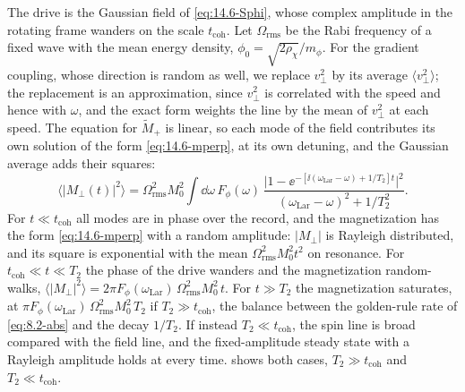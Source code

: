 The drive is the Gaussian field of \cref{eq:14.6-Sphi}, whose complex amplitude in the rotating frame wanders on the scale $t_{\mathrm{coh}}$. Let $\Omega_{\mathrm{rms}}$ be the Rabi frequency of a fixed wave with the mean energy density, $\phi_0 = \sqrt{2\rho_\chi}/m_\phi$. For the gradient coupling, whose direction is random as well, we replace $v_\perp^2$ by its average $\langle v_\perp^2\rangle$; the replacement is an approximation, since $v_\perp^2$ is correlated with the speed and hence with $\omega$, and the exact form weights the line by the mean of $v_\perp^2$ at each speed. The equation for $\tilde M_+$ is linear, so each mode of the field contributes its own solution of the form \cref{eq:14.6-mperp}, at its own detuning, and the Gaussian average adds their squares:
\begin{equation}
  \bigl\langle|M_\perp(t)|^2\bigr\rangle = \Omega_{\mathrm{rms}}^2M_0^2\int\dd\omega\,F_\phi(\omega)\,\frac{\bigl|1 - \ee^{-[\ii(\omega_{\mathrm{Lar}} - \omega) + 1/T_2]t}\bigr|^2}{(\omega_{\mathrm{Lar}} - \omega)^2 + 1/T_2^2} .
  \label{eq:14.6-ms}
\end{equation}
For $t \ll t_{\mathrm{coh}}$ all modes are in phase over the record, and the magnetization has the form \cref{eq:14.6-mperp} with a random amplitude: $|M_\perp|$ is Rayleigh distributed, and its square is exponential with the mean $\Omega_{\mathrm{rms}}^2M_0^2t^2$ on resonance. For $t_{\mathrm{coh}} \ll t \ll T_2$ the phase of the drive wanders and the magnetization random-walks, $\langle|M_\perp|^2\rangle = 2\pi F_\phi(\omega_{\mathrm{Lar}})\,\Omega_{\mathrm{rms}}^2M_0^2\,t$. For $t \gg T_2$ the magnetization saturates, at $\pi F_\phi(\omega_{\mathrm{Lar}})\,\Omega_{\mathrm{rms}}^2M_0^2\,T_2$ if $T_2 \gg t_{\mathrm{coh}}$, the balance between the golden-rule rate of \cref{eq:8.2-abs} and the decay $1/T_2$. If instead $T_2 \ll t_{\mathrm{coh}}$, the spin line is broad compared with the field line, and the fixed-amplitude steady state with a Rayleigh amplitude holds at every time.  shows both cases, $T_2 \gg t_{\mathrm{coh}}$ and $T_2 \ll t_{\mathrm{coh}}$.
